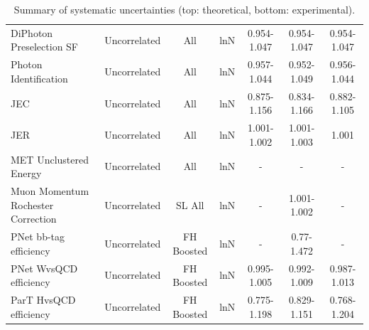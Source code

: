 \begin{table}[!htbp]
\begin{center}
{\begin{tabular}{l | c | c | c | c | c | c}
    DiPhoton Preselection SF & Uncorrelated & All & lnN & 0.954-1.047 & 0.954-1.047 & 0.954-1.047 \\
    Photon Identification & Uncorrelated & All & lnN & 0.957-1.044 & 0.952-1.049 & 0.956-1.044 \\
    \hline
    JEC  &  Uncorrelated & All & lnN & 0.875-1.156 & 0.834-1.166 & 0.882-1.105 \\
    \hline
    JER & Uncorrelated & All & lnN & 1.001-1.002 & 1.001-1.003 & 1.001 \\
    MET Unclustered Energy & Uncorrelated & All &  lnN & - & - & - \\
    Muon Momentum Rochester Correction & Uncorrelated & SL All  & lnN & - & 1.001-1.002 & - \\
    PNet bb-tag efficiency & Uncorrelated & FH Boosted  &  lnN & - & 0.77-1.472 & -\\
    PNet WvsQCD efficiency & Uncorrelated & FH Boosted & lnN & 0.995-1.005  & 0.992-1.009 & 0.987-1.013 \\
    ParT HvsQCD efficiency & Uncorrelated & FH Boosted & lnN & 0.775-1.198 & 0.829-1.151 & 0.768-1.204 \\

    \hline
    \hline
    \end{tabular}
    }
    \caption{Summary of systematic uncertainties (top: theoretical, bottom: experimental).}
    \label{table:sys-tab}
    \end{center}
  \end{table}

